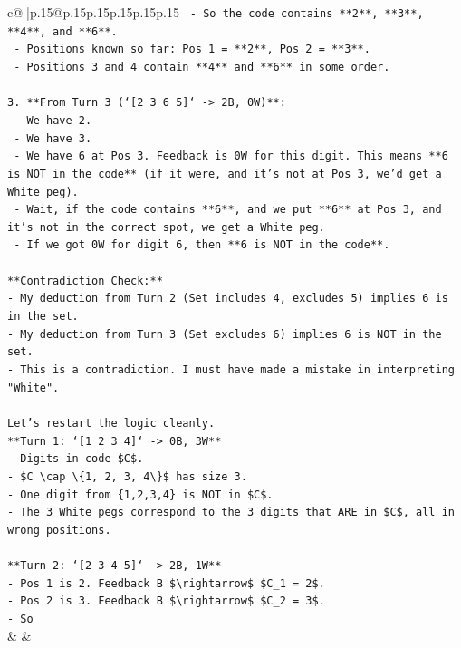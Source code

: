 \documentclass{article}
\begin{document}
{\begin{supertabular}{c@{$\;$}|p{.15\linewidth}@{}p{.15\linewidth}p{.15\linewidth}p{.15\linewidth}p{.15\linewidth}p{.15\linewidth}}
{{{\texttt{    {-} So the code contains **2**, **3**, **4**, and **6**.} \\
\texttt{    {-} Positions known so far: Pos 1 = **2**, Pos 2 = **3**.} \\
\texttt{    {-} Positions 3 and 4 contain **4** and **6** in some order.} \\
\\ 
\texttt{3.  **From Turn 3 (`{[}2 3 6 5{]}` {-}> 2B, 0W)**:} \\
\texttt{    {-} We have 2.} \\
\texttt{    {-} We have 3.} \\
\texttt{    {-} We have 6 at Pos 3. Feedback is 0W for this digit. This means **6 is NOT in the code** (if it were, and it's not at Pos 3, we'd get a White peg).} \\
\texttt{    {-} Wait, if the code contains **6**, and we put **6** at Pos 3, and it's not in the correct spot, we get a White peg.} \\
\texttt{    {-} If we got 0W for digit 6, then **6 is NOT in the code**.} \\
\\ 
\texttt{**Contradiction Check:**} \\
\texttt{{-} My deduction from Turn 2 (Set includes 4, excludes 5) implies 6 is in the set.} \\
\texttt{{-} My deduction from Turn 3 (Set excludes 6) implies 6 is NOT in the set.} \\
\texttt{{-} This is a contradiction. I must have made a mistake in interpreting "White".} \\
\\ 
\texttt{Let's restart the logic cleanly.} \\
\texttt{**Turn 1: `{[}1 2 3 4{]}` {-}> 0B, 3W**} \\
\texttt{{-} Digits in code \$C\$.} \\
\texttt{{-} \$C \textbackslash{}cap \textbackslash{}\{1, 2, 3, 4\textbackslash{}\}\$ has size 3.} \\
\texttt{{-} One digit from \{1,2,3,4\} is NOT in \$C\$.} \\
\texttt{{-} The 3 White pegs correspond to the 3 digits that ARE in \$C\$, all in wrong positions.} \\
\\ 
\texttt{**Turn 2: `{[}2 3 4 5{]}` {-}> 2B, 1W**} \\
\texttt{{-} Pos 1 is 2. Feedback B \$\textbackslash{}rightarrow\$ \$C\_1 = 2\$.} \\
\texttt{{-} Pos 2 is 3. Feedback B \$\textbackslash{}rightarrow\$ \$C\_2 = 3\$.} \\
\texttt{{-} So} \\
            }
        }
    }
    & & \\ \\


\end{supertabular}}
\end{document}
